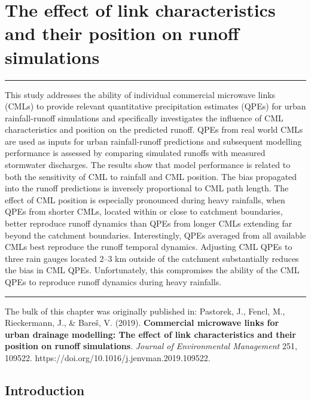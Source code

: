 \documentclass{ctuthesis}\usepackage[]{graphicx}\usepackage[]{color}
\begin{document}
 




        


\chapter{The effect of link characteristics and their position on runoff simulations} \label{chap5}

\rule{\textwidth}{0.4pt}
This study addresses the ability of individual commercial microwave links (CMLs) to provide relevant quantitative precipitation estimates (QPEs) for urban rainfall-runoff simulations and specifically investigates the influence of CML characteristics and position on the predicted runoff. QPEs from real world CMLs are used as inputs for urban rainfall-runoff predictions and subsequent modelling performance is assessed by comparing simulated runoffs with measured stormwater discharges. The results show that model performance is related to both the sensitivity of CML to rainfall and CML position. The bias propagated into the runoff predictions is inversely proportional to CML path length. The effect of CML position is especially pronounced during heavy rainfalls, when QPEs from shorter CMLs, located within or close to catchment boundaries, better reproduce runoff dynamics than QPEs from longer CMLs extending far beyond the catchment boundaries. Interestingly, QPEs averaged from all available CMLs best reproduce the runoff temporal dynamics. Adjusting CML QPEs to three rain gauges located 2--3 km outside of the catchment substantially reduces the bias in CML QPEs. Unfortunately, this compromises the ability of the CML QPEs to reproduce runoff dynamics during heavy rainfalls.
\rule[0.2cm]{\textwidth}{0.4pt}

{\footnotesize The bulk of this chapter was originally published in:  \newline
\-\hspace{0.5cm}
Pastorek, J., Fencl, M., Rieckermann, J., \& Bareš, V. (2019).  \textbf{Commercial microwave links for urban drainage modelling: The effect of link characteristics and their position on runoff simulations}. \emph{Journal of Environmental Management} 251, 109522. https://doi.org/10.1016/j.jenvman.2019.109522.
}

\section{Introduction}
\end{document}
